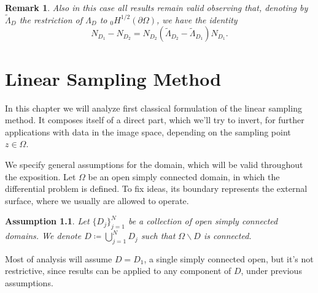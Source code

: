 \documentclass[10pt, a4paper, twoside, openright]{book}
\theoremstyle{definition}
\theoremstyle{plain}
\theoremstyle{plain}
\theoremstyle{plain}
\theoremstyle{plain}
\newtheorem{remark}[subsection]{Remark}
\theoremstyle{plain}
\theoremstyle{plain}
\theoremstyle{plain}
\newtheorem{assumption}[subsection]{Assumption}
\theoremstyle{plain}
\begin{document}
\begin{remark}
Also in this case all results remain valid observing  that, denoting by $\tilde\Lambda_D$ the restriction of 
$\Lambda_D$ to $_0H^{1/2}(\partial\Omega)$, we have the identity
$$N_{D_1}-N_{D_2}=N_{D_2}(\tilde\Lambda_{D_2}-\tilde\Lambda_{D_1})N_{D_1}.$$
\end{remark}


\chapter{Linear Sampling Method}
\label{ch:linear-sampling}
\begin{figure}[tb]
\begin{center}
\end{center}
\end{figure}
In this chapter we will analyze first classical formulation of the linear sampling method. It composes itself 
of a direct part, which we'll try to invert, for further applications with data in the image space, 
depending on the sampling point $z\in\Omega$.
\par
We specify general assumptions for the domain, which will be valid throughout the exposition.
Let $\Omega$ be an open simply connected domain, in which the differential problem is defined.
To fix ideas, its boundary represents the external surface, where we usually are allowed to operate.
\begin{assumption}
\label{assumption:connected}
 Let $\bigl\{D_j\bigr\}_{j=1}^N$ be a collection of open simply connected domains.
 We denote $D\coloneqq\bigcup_{j=1}^ND_j$ such that $\Omega\backslash D$ is connected.
\end{assumption}
Most of analysis will assume $D=D_1$, a single simply connected open, but it's not restrictive, since results can be applied to any component of $D$, under previous assumptions.
\end{document}
